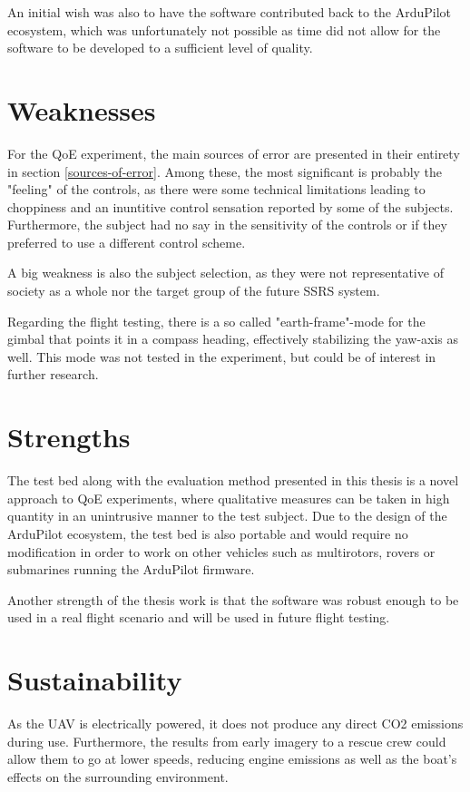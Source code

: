 \documentclass[nofilelist]{cslthse-msc}
\begin{document}
An initial wish was also to have the software contributed back to the ArduPilot ecosystem, which was unfortunately not possible as time did not allow for the software to be developed to a sufficient level of quality.

\section{Weaknesses}
For the QoE experiment, the main sources of error are presented in their entirety in section \ref{sources-of-error}. Among these, the most significant is probably the "feeling" of the controls, as there were some technical limitations leading to choppiness and an inuntitive control sensation reported by some of the subjects. Furthermore, the subject had no say in the sensitivity of the controls or if they preferred to use a different control scheme.

A big weakness is also the subject selection, as they were not representative of society as a whole nor the target group of the future SSRS system.   

Regarding the flight testing, there is a so called "earth-frame"-mode for the gimbal that points it in a compass heading, effectively stabilizing the yaw-axis as well. This mode was not tested in the experiment, but could be of interest in further research.

\section{Strengths}
The test bed along with the evaluation method presented in this thesis is a novel approach to QoE experiments, where qualitative measures can be taken in high quantity in an unintrusive manner to the test subject. Due to the design of the ArduPilot ecosystem, the test bed is also portable and would require no modification in order to work on other vehicles such as multirotors, rovers or submarines running the ArduPilot firmware.

Another strength of the thesis work is that the software was robust enough to be used in a real flight scenario and will be used in future flight testing.

\section{Sustainability}
As the UAV is electrically powered, it does not produce any direct CO2 emissions during use. Furthermore, the results from early imagery to a rescue crew could allow them to go at lower speeds, reducing engine emissions as well as the boat's effects on the surrounding environment. 
\end{document}
